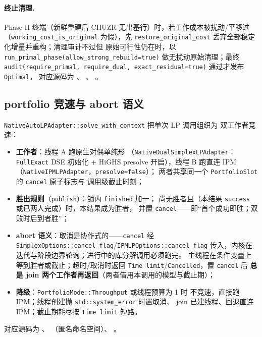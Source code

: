 \paragraph{终止清理.}
Phase II 终端（新鲜重建后 CHUZR 无出基行）时，若工作成本被扰动/平移过
（\texttt{working\_cost\_is\_original} 为假），先
\texttt{restore\_original\_cost} 丢弃全部稳定化增量并重构；清理审计不过但
原始可行性仍在时，以 \texttt{run\_primal\_phase(allow\_strong\_rebuild=true)}
做无扰动原始清理；最终 \texttt{audit(require\_primal, require\_dual,
exact\_residual=true)} 通过才发布 \texttt{Optimal}。
对应源码为 、
、
。

\subsection{portfolio 竞速与 abort 语义}
\label{subsec:engine-lp-portfolio}

\texttt{NativeAutoLPAdapter::solve\_with\_context} 把单次 LP 调用组织为
双工作者竞速：
\begin{itemize}
  \item \textbf{工作者}：线程 A 跑原生对偶单纯形
        （\texttt{NativeDualSimplexLPAdapter}：\texttt{FullExact} DSE 初始化 +
        HiGHS presolve 开启），线程 B 跑直连 IPM
        （\texttt{NativeIPMLPAdapter}，\texttt{presolve=false}）；
        两者共享同一个 \texttt{PortfolioSlot} 的 \texttt{cancel} 原子标志与
        调用级截止时刻；
  \item \textbf{胜出规则}（\texttt{publish}）：锁内 \texttt{finished} 加一；
        尚无胜者且（本结果 \texttt{success} 或已两人完成）时，本结果成为胜者，
        并置 \texttt{cancel}——即``首个成功即胜；双败时后到者胜''；
  \item \textbf{abort 语义}：取消是协作式的——\texttt{cancel} 经
        \texttt{SimplexOptions::cancel\_flag}/\texttt{IPMLPOptions::cancel\_flag}
        传入，内核在迭代与阶段边界轮询；进行中的库分解调用必须跑完。
        主线程在条件变量上等到胜者或截止；超时/取消时返回
        \texttt{Time limit}/\texttt{Cancelled}，置 \texttt{cancel} 后
        \textbf{总是 join 两个工作者再返回}（两者借用本调用的模型与截止期）；
  \item \textbf{降级}：\texttt{PortfolioMode::Throughput} 或线程预算为 1 时
        不竞速，直接跑 IPM；线程创建抛 \texttt{std::system\_error} 时置取消、
        join 已建线程、回退直连 IPM；截止期耗尽按 \texttt{Time limit} 短路。
\end{itemize}
对应源码为 、
（匿名命名空间）、
。

